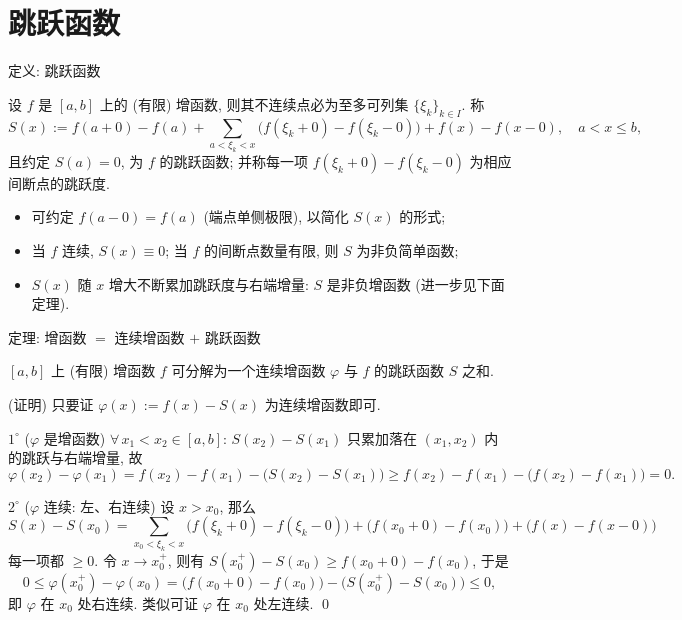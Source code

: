 
\section[跳跃函数]{跳跃函数}


\begin{frame}{定义: 跳跃函数}

\begin{Def}
设 $f$ 是 $[a, b]$ 上的 (有限) 增函数, 则其不连续点必为至多可列集
$\{ \xi_k \}_{k \in I}$. 称
\[
S(x) := f(a + 0) - f(a)
+ \sum_{a < \xi_k < x} \big( f(\xi_k + 0) - f(\xi_k - 0) \big)
+ f(x) - f(x - 0), \quad a < x \leqslant b,
\]
且约定 $S(a) = 0$, 为 $f$ 的\alert{跳跃函数}; 并称每一项
$f(\xi_k + 0) - f(\xi_k - 0)$ 为相应间断点的\alert{跳跃度}.
\end{Def}

\pause

\begin{itemize}
\item 可约定 $f(a - 0) = f(a)$ (端点单侧极限), 以简化 $S(x)$ 的形式;
\item 当 $f$ 连续, $S(x) \equiv 0$; \quad 当 $f$ 的间断点数量有限, 则 $S$ 为非负简单函数;
\item $S(x)$ 随 $x$ 增大不断累加跳跃度与右端增量: $S$ 是\alert{非负增函数}
  (进一步见下面定理).
\end{itemize}

\end{frame}


\begin{frame}{定理: 增函数 $=$ 连续增函数 $+$ 跳跃函数}

\begin{thm}
$[a, b]$ 上 (有限) 增函数 $f$ 可分解为一个连续增函数 $\varphi$ 与 $f$ 的跳跃函数 $S$ 之和.
\end{thm}

\startproof[bg=yellow, fg=red](证明)
只要证 $\varphi(x) := f(x) - S(x)$ 为连续增函数即可.

\pause

$1^{\circ}$ ($\varphi$ 是增函数) $\forall\, x_1 < x_2 \in [a, b]$:
$S(x_2) - S(x_1)$ 只累加落在 $(x_1, x_2)$ 内的跳跃与右端增量, 故
\[
\varphi(x_2) - \varphi(x_1)
= f(x_2) - f(x_1) - \big( S(x_2) - S(x_1) \big)
\geqslant f(x_2) - f(x_1) - \big( f(x_2) - f(x_1) \big) = 0 .
\]

$2^{\circ}$ ($\varphi$ 连续: 左、右连续) 设 $x > x_0$, 那么
\[
S(x) - S(x_0)
= \sum_{x_0 < \xi_k < x} \big( f(\xi_k + 0) - f(\xi_k - 0) \big)
+ \big( f(x_0 + 0) - f(x_0) \big)
+ \big( f(x) - f(x - 0) \big)
\]
每一项都 $\geqslant 0$. 令 $x \to x_0^+$, 则有
$S(x_0^+) - S(x_0) \geqslant f(x_0 + 0) - f(x_0)$, 于是
\[
0 \leqslant \varphi(x_0^+) - \varphi(x_0)
= \big( f(x_0 + 0) - f(x_0) \big) - \big( S(x_0^+) - S(x_0) \big)
\leqslant 0 ,
\]
即 $\varphi$ 在 $x_0$ 处右连续. 类似可证 $\varphi$ 在 $x_0$ 处左连续.
\qed

\end{frame}

